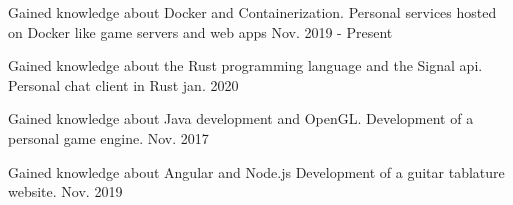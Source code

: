 

\begin{cventries}

  \cventry
    {Gained knowledge about Docker and Containerization.} %
    {Personal services hosted on Docker like game servers and web apps} %
    {} %
    {Nov. 2019 - Present} %
    {
    }

  \cventry
    {Gained knowledge about the Rust programming language and the Signal api.} %
    {Personal chat client in Rust} %
    {} %
    {jan. 2020} %
    {
    }

  \cventry
    {Gained knowledge about Java development and OpenGL.} %
    {Development of a personal game engine.} %
    {} %
    {Nov. 2017} %
    {
    }

  \cventry
    {Gained knowledge about Angular and Node.js} %
    {Development of a guitar tablature website.} %
    {} %
    {Nov. 2019} %
    {
    }


\end{cventries}
